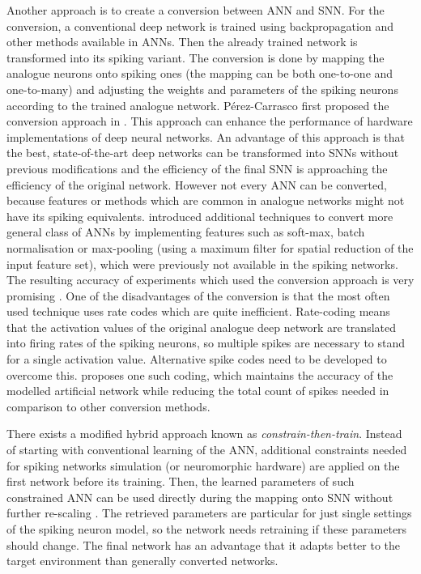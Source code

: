 Another approach is to create a conversion between ANN and SNN. For the conversion, a conventional deep network is trained using backpropagation and other methods available in ANNs. Then the already trained network is transformed into its spiking variant. The conversion is done by mapping the analogue neurons onto spiking ones (the mapping can be both one-to-one and one-to-many) and adjusting the weights and parameters of the spiking neurons according to the trained analogue network. Pérez-Carrasco first proposed the conversion approach in \cite{perez-carrascoMappingFrameDriven13}. This approach can enhance the performance of hardware implementations of deep neural networks. An advantage of this approach is that the best, state-of-the-art deep networks can be transformed into SNNs without previous modifications and the efficiency of the final SNN is approaching the efficiency of the original network. However not every ANN can be converted, because features or methods which are common in analogue networks might not have its spiking equivalents. \cite{rueckauerConversionContinuousValuedDeep2017} introduced additional techniques to convert more general class of ANNs by implementing features such as soft-max, batch normalisation or max-pooling (using a maximum filter for spatial reduction of the input feature set), which were previously not available in the spiking networks. The resulting accuracy of experiments which used the conversion approach is very promising \cite{tavanaeiDeepLearningSpiking2019, pfeifferDeepLearningSpiking2018}. One of the disadvantages of the conversion is that the most often used technique uses rate codes which are quite inefficient. Rate-coding means that the activation values of the original analogue deep network are translated into firing rates of the spiking neurons, so multiple spikes are necessary to stand for a single activation value. Alternative spike codes need to be developed to overcome this. \cite{zambranoFastEfficientAsynchronous2016} proposes one such coding, which maintains the accuracy of the modelled artificial network while reducing the total count of spikes needed in comparison to other conversion methods. \par
There exists a modified hybrid approach known as \textit{constrain-then-train}. Instead of starting with conventional learning of the ANN, additional constraints needed for spiking networks simulation (or neuromorphic hardware) are applied on the first network before its training. Then, the learned parameters of such constrained ANN can be used directly during the mapping onto SNN without further re-scaling \cite{pfeifferDeepLearningSpiking2018}. The retrieved parameters are particular for just single settings of the spiking neuron model, so the network needs retraining if these parameters should change. The final network has an advantage that it adapts better to the target environment than generally converted networks. \par
